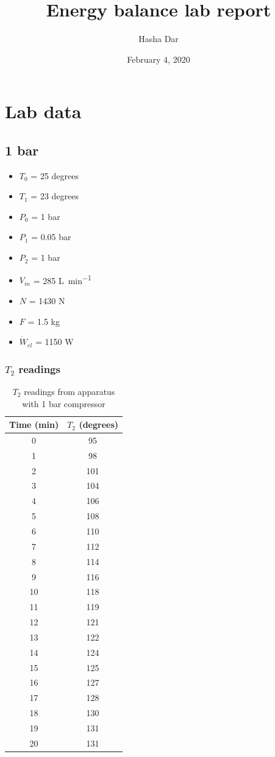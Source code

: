 \documentclass[class=article, crop=false, 12pt,a4paper]{standalone}
\begin{document}
\title{Energy balance lab report}
\author{Hasha Dar}
\date{February 4, 2020}
\maketitle
\tableofcontents
\newpage
\section{Lab data}
\subsection{1 bar}
\begin{multicols}{2}
  \begin{itemize}[noitemsep]
    \item \(T_0\) = 25 degrees
    \item \(T_1\) = 23 degrees
    \item \(P_0\) = 1 \si{bar}
    \item \(P_1\) = 0.05 \si{bar}
    \item \(P_2\) = 1 \si{\bar}
    \item \(V_{in}\) = 285 \si{\liter\per\minute}
    \item \(N\) = 1430 \si{\newton}
    \item \(F\) = 1.5 \si{\kilogram}
    \item \(\dot{W}_{el}\) = 1150 \si{\watt}
  \end{itemize}
\end{multicols}
\subsubsection{\(T_2\) readings} 
\begin{table}
  \centering
    \begin{tabular}{|c|c|}
      \hline
      Time (\si{\minute}) & \(T_2\) (degrees)\\
      \hline
      0 & 95\\
      1 & 98\\
      2 & 101\\
      3 & 104\\
      4 & 106\\
      5 & 108\\
      6 & 110\\
      7 & 112\\
      8 & 114\\
      9 & 116\\
      10 & 118\\
      11 & 119\\
      12 & 121\\
      13 & 122\\
      14 & 124\\
      15 & 125\\
      16 & 127\\
      17 & 128\\
      18 & 130\\
      19 & 131\\
      20 & 131\\
      \hline
    \end{tabular}
  \caption{\(T_2\) readings from apparatus with 1 bar compressor}
  \label{table:1}
\end{table}
\end{document}
